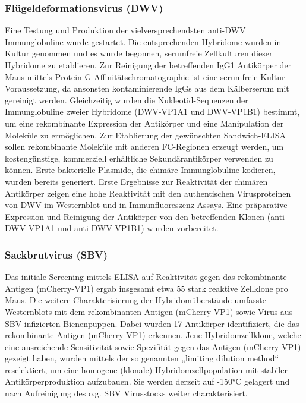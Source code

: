 \subsubsection{Flügeldeformationsvirus (DWV)}
Eine Testung und Produktion der vielversprechendsten anti-DWV Immunglobuline wurde gestartet. Die entsprechenden Hybridome wurden in Kultur genommen und es wurde begonnen, serumfreie Zellkulturen dieser Hybridome zu etablieren. Zur Reinigung der betreffenden IgG1 Antikörper der Maus mittels Protein-G-Affinitätschromatographie ist eine serumfreie Kultur Voraussetzung, da ansonsten kontaminierende IgGs aus dem Kälberserum mit gereinigt werden. Gleichzeitig wurden die Nukleotid-Sequenzen der Immunglobuline zweier Hybridome (DWV-VP1A1 und DWV-VP1B1) bestimmt, um eine rekombinante Expression der Antikörper und eine Manipulation der Moleküle zu ermöglichen. Zur Etablierung der gewünschten Sandwich-ELISA sollen rekombinante Moleküle mit anderen FC-Regionen erzeugt werden, um kostengünstige, kommerziell erhältliche Sekundärantikörper verwenden zu können. Erste bakterielle Plasmide, die chimäre Immunglobuline kodieren, wurden bereits generiert. Erste Ergebnisse zur Reaktivität der chimären Antikörper zeigen eine hohe Reaktivität mit den authentischen Virusproteinen von DWV im Westernblot und in Immunfluoreszenz-Assays. Eine präparative Expression und Reinigung der Antikörper von den betreffenden Klonen (anti-DWV VP1A1 und anti-DWV VP1B1) wurden vorbereitet.

\subsubsection{Sackbrutvirus (SBV)}
Das initiale Screening mittels ELISA auf Reaktivität gegen das rekombinante Antigen (mCherry-VP1) ergab insgesamt etwa 55 stark reaktive Zellklone pro Maus. 
Die weitere Charakterisierung der Hybridomüberstände umfasste Westernblots mit dem rekombinanten Antigen (mCherry-VP1) sowie Virus aus SBV infizierten Bienenpuppen. Dabei wurden 17 Antikörper identifiziert, die das rekombinante Antigen (mCherry-VP1) erkennen. Jene Hybridomzellklone, welche eine ausreichende Sensitivität sowie Spezifität gegen das Antigen (mCherry-VP1) gezeigt haben, wurden mittels der so genannten „limiting dilution method“ reselektiert, um eine homogene (klonale) Hybridomzellpopulation mit stabiler Antikörperproduktion aufzubauen. Sie werden derzeit auf -150°C gelagert und nach Aufreinigung des o.g. SBV Virusstocks weiter charakterisiert.

